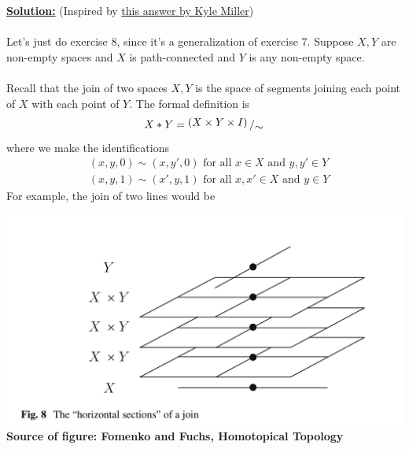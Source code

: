\documentclass[11pt]{article}
\begin{document}
\vskip 0.5cm
\textbf{\underline{Solution:}} (Inspired by \href{https://math.stackexchange.com/questions/187562/proving-that-the-join-of-a-path-connected-space-with-an-arbitrary-space-is-simpl}{this answer by Kyle Miller})
\\
\\
Let's just do exercise 8, since it's a generalization of exercise 7. Suppose $X, Y$ are non-empty spaces and $X$ is path-connected and $Y$ is any non-empty space.
\\
\\
Recall that the join of two spaces $X, Y$ is the space of segments joining each point of $X$ with each point of $Y$. The formal definition is $$ X * Y = \bigslant{(X \times Y \times I)}{\sim} $$ where we make the identifications 
\begin{align*}
  &(x, y, 0) \sim (x, y', 0) \text{ for all } x \in X \text{ and } y,y' \in Y \\
  &(x, y, 1) \sim (x', y, 1) \text{ for all } x, x' \in X \text{ and } y \in Y 
\end{align*} For example, the join of two lines would be 
\begin{center}
  \includegraphics*[scale=0.35]{Join_of_top_spaces.png} \\
  \textbf{Source of figure: Fomenko and Fuchs, Homotopical Topology}
\end{center} 
\end{document}
